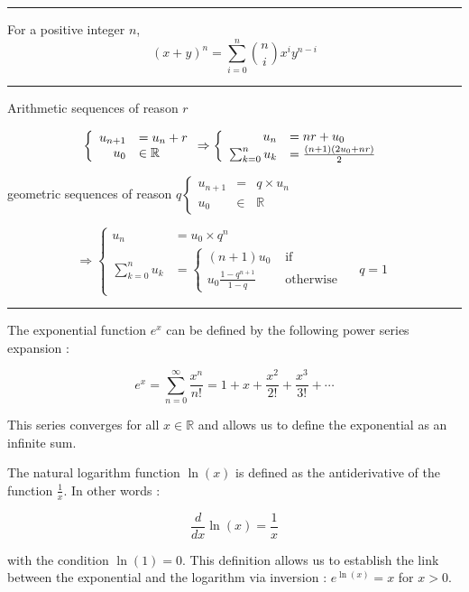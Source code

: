 \hrule
\begin{f}
	
	For a positive integer $n$,
	$$
	(x+y)^n=\sum_{i=0}^n\binom{n}{i} x^i y^{n-i}
	$$
	
\end{f}
\hrule
\begin{f}[Sequences]  
	
	Arithmetic sequences of reason $r$
	
	$$
	\left\{\begin{array} { r l } 
		{ u _ { n + 1 } } & { = u _ { n } + r } \\
		{ u _ { 0 } } & { \in \mathbb { R } }
	\end{array} \Rightarrow \left\{\begin{array}{rl}
		u_n & =n r+u_0 \\
		\sum_{k=0}^n u_k & =\frac{(n+1)\left(2 u_0+n r\right)}{2}
	\end{array}\right.\right.
	$$
	
	geometric sequences of reason $q\left\{\begin{array}{rll}u_{n+1} & = & q \times u_n \\ u_0 & \in & \mathbb{R}\end{array}\right.$
	
	$$
	\Rightarrow\left\{\begin{array}{rlr}
		u_n & =u_0 \times q^n \\
		\sum_{k=0}^n u_k & =\left\{\begin{array}{rl}
			(n+1) u_0 & \text { if } \\
			u_0 \frac{1-q^{n+1}}{1-q} & \text { otherwise }
		\end{array} \quad q=1\right.
	\end{array}\right.
	$$
	
\end{f}
\hrule
\begin{f}
	The exponential function \( e^x \) can be defined by the following power series expansion :
	
	\[
	e^x = \sum_{n=0}^{\infty} \frac{x^n}{n!} = 1 + x + \frac{x^2}{2!} + \frac{x^3}{3!} + \cdots
	\]
	
	This series converges for all \( x \in \mathbb{R} \) and allows us to define the exponential as an infinite sum.
	
	
	The natural logarithm function \( \ln(x) \) is defined as the antiderivative of the function \( \frac{1}{x} \). In other words :
	
	\[
	\frac{d}{dx} \ln(x) = \frac{1}{x}
	\]
	
	with the condition \( \ln(1) = 0 \). This definition allows us to establish the link between the exponential and the logarithm via inversion : \( e^{\ln(x)} = x \) for \( x > 0 \).
	
\end{f}



